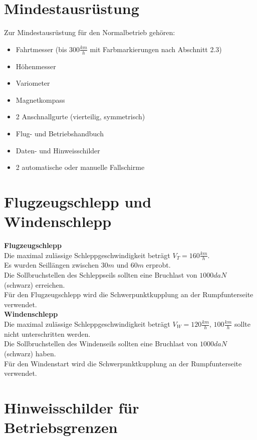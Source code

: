 \section{Mindestausrüstung}
Zur Mindestausrüstung für den Normalbetrieb gehören:\\
\begin{itemize}
\item Fahrtmesser (bis $300\frac{km}{h}$ mit Farbmarkierungen nach Abschnitt 2.3)
\item Höhenmesser
\item Variometer
\item Magnetkompass
\item 2 Anschnallgurte (vierteilig, symmetrisch)
\item Flug- und Betriebshandbuch
\item Daten- und Hinweisschilder
\item 2 automatische oder manuelle Fallschirme
\end{itemize}

\section{Flugzeugschlepp und Windenschlepp}

\textbf{Flugzeugschlepp}\\
Die maximal zulässige Schleppgeschwindigkeit beträgt $V_T=160\frac{km}{h}$.\\
Es wurden Seillängen zwischen $30m$ und $60m$ erprobt.\\
Die Sollbruchstellen des Schleppseils sollten eine Bruchlast von $1000daN$ (schwarz) erreichen.\\
Für den Flugzeugschlepp wird die Schwerpunktkupplung an der Rumpfunterseite verwendet.\\

\textbf{Windenschlepp}\\
Die maximal zulässige Schleppgeschwindigkeit beträgt $V_W=120\frac{km}{h}$, $100\frac{km}{h}$ sollte nicht unterschritten werden.\\
Die Sollbruchstellen des Windenseils sollten eine Bruchlast von $1000daN$ (schwarz) haben.\\
Für den Windenstart wird die Schwerpunktkupplung an der Rumpfunterseite verwendet.
\newpage

\section{Hinweisschilder für Betriebsgrenzen}

